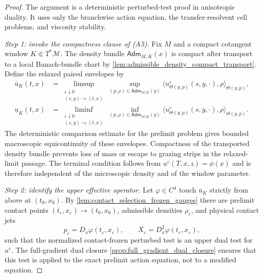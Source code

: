 \documentclass[12pt, letterpaper]{amsart}
\newcommand{\Mcal}{\mathcal{M}}
\newcommand{\Adm}{\mathsf{Adm}}
\theoremstyle{plain}
\theoremstyle{definition}
\theoremstyle{remark}
\begin{document}
\begin{proof}
The argument is a deterministic perturbed-test proof in anisotropic duality.  It
uses only the branchwise action equation, the transfer-resolvent cell problems,
and viscosity stability.


\emph{Step 1: invoke the compactness clause of \textup{(A5)}.}
Fix $M$ and a compact cotangent window $K\Subset T^*\Mcal$.  The density
bundle $\Adm_{M,K}(x)$ is compact after transport to a local Banach-bundle
chart by \cref{lem:admissible_density_compact_transport}.  Define the relaxed
paired envelopes by
\begin{equation}
\label{eq:windowed_relaxed_limits_main}
\begin{split}
    \overline u_K(t,x)&=
    \limsup_{\substack{\varepsilon\downarrow0\\(s,y)\to(t,x)}}
    \sup_{(p,\rho)\in\Adm_{M,K}(y)}
       \langle u^\varepsilon_{\Theta(y,p)}(s,y,\cdot),\rho\rangle_{\Theta(y,p)},\\
    \underline u_K(t,x)&=
    \liminf_{\substack{\varepsilon\downarrow0\\(s,y)\to(t,x)}}
    \inf_{(p,\rho)\in\Adm_{M,K}(y)}
       \langle u^\varepsilon_{\Theta(y,p)}(s,y,\cdot),\rho\rangle_{\Theta(y,p)} .
\end{split}
\end{equation}
The deterministic comparison estimate for the prelimit problem gives bounded
macroscopic equicontinuity of these envelopes.  Compactness of the transported
density bundle prevents loss of mass or escape to grazing strips in the
relaxed-limit passage.  The terminal condition follows from
$u^\varepsilon(T,x,z)=\phi(x)$ and is therefore independent of the microscopic
density and of the window parameter.

\emph{Step 2: identify the upper effective operator.}
Let $\varphi\in C^4$ touch $\overline u_K$ strictly from above at
$(t_0,x_0)$.  By \cref{lem:contact_selection_frozen_gauges} there are prelimit
contact points $(t_\varepsilon,x_\varepsilon)\to(t_0,x_0)$, admissible densities
$\rho_\varepsilon$, and physical contact jets
\begin{equation}
    p_\varepsilon=D_x\varphi(t_\varepsilon,x_\varepsilon),
    \qquad
    X_\varepsilon=D_x^2\varphi(t_\varepsilon,x_\varepsilon),
\end{equation}
such that the normalized contact-frozen perturbed test is an upper dual test for
$u^\varepsilon$.  The full-gradient dual closure \cref{prop:full_gradient_dual_closure} ensures that this test is applied to the exact prelimit action equation, not to a modified equation.


\end{proof}
\end{document}
